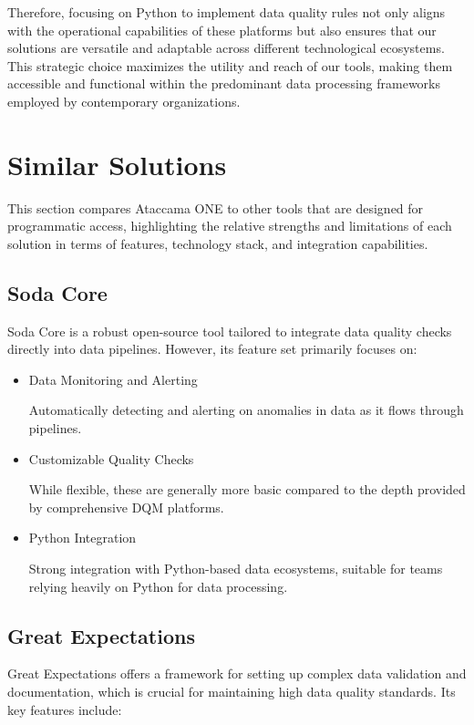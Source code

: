 Therefore, focusing on Python to implement data quality rules not only aligns with the operational capabilities of these platforms but also ensures that our solutions are versatile and adaptable across different technological ecosystems. This strategic choice maximizes the utility and reach of our  tools, making them accessible and functional within the predominant data processing frameworks employed by contemporary organizations.

\section{Similar Solutions}

This section compares Ataccama ONE to other  tools that are designed for programmatic access, highlighting the relative strengths and limitations of each solution in terms of features, technology stack, and integration capabilities.

\subsection{Soda Core}

Soda Core is a robust open-source tool tailored to integrate data quality checks directly into data pipelines. However, its feature set primarily focuses on:

\begin{itemize}
    \item Data Monitoring and Alerting
    
    Automatically detecting and alerting on anomalies in data as it flows through pipelines.

    \item Customizable Quality Checks

    While flexible, these are generally more basic compared to the depth provided by comprehensive DQM platforms.

    \item Python Integration
    
    Strong integration with Python-based data ecosystems, suitable for teams relying heavily on Python for data processing.
\end{itemize}

\subsection{Great Expectations}

Great Expectations offers a framework for setting up complex data validation and documentation, which is crucial for maintaining high data quality standards. Its key features include:

